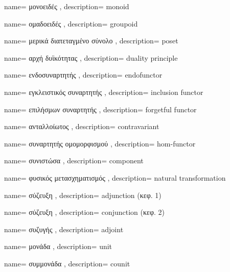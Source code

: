 {name={
μονοειδές
},
description={
monoid
}}

{name={
ομαδοειδές
},
description={
groupoid
}}

{name={
μερικά διατεταγμένο σύνολο
},
description={
poset
}}

{name={
αρχή δυϊκότητας
},
description={
duality principle
}}

{name={
ενδοσυναρτητής
},
description={
endofunctor
}}

{name={
εγκλειστικός συναρτητής
},
description={
inclusion functor
}}

{name={
επιλήσμων συναρτητής
},
description={
forgetful functor
}}

{name={
ανταλλοίωτος
},
description={
contravariant
}}

{name={
συναρτητής ομομορφισμού
},
description={
hom-functor
}}

{name={
συνιστώσα
},
description={
component
}}



{name={
φυσικός μετασχηματισμός
},
description={
natural transformation
}}

{name={
σύζευξη
},
description={
adjunction (κεφ. 1)
}}

{name={
σύζευξη
},
description={
conjunction (κεφ. 2)
}}

{name={
συζυγής
},
description={
adjoint
}}

{name={
μονάδα
},
description={
unit
}}


{name={
συμμονάδα
},
description={
counit
}}

